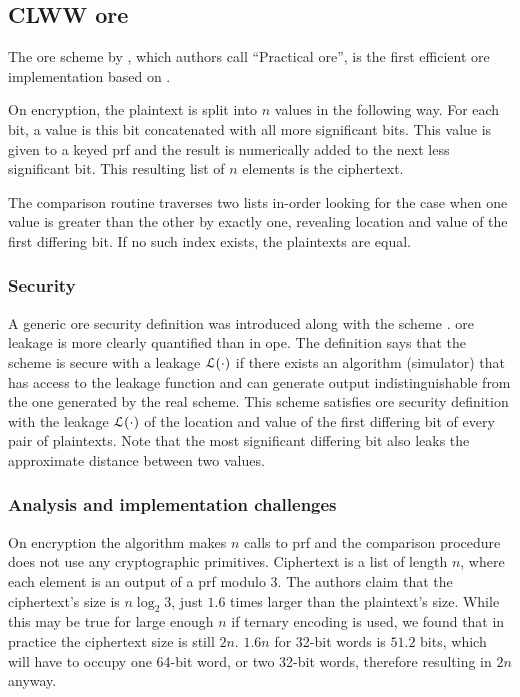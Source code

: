\subsection{CLWW \acrshort{ore}}\label{section:range-snapshot:clww}

	The \acrshort{ore} scheme by \textcite{clww-ore}, which authors call ``Practical \acrshort{ore}'', is the first efficient \acrshort{ore} implementation based on .

	On encryption, the plaintext is split into $n$ values in the following way.
	For each bit, a value is this bit concatenated with all more significant bits.
	This value is given to a keyed \acrshort{prf} and the result is numerically added to the next less significant bit.
	This resulting list of $n$ elements is the ciphertext.

	The comparison routine traverses two lists in-order looking for the case when one value is greater than the other by exactly one, revealing location and value of the first differing bit.
	If no such index exists, the plaintexts are equal.

	\subsubsection{Security}
		A generic \acrshort{ore} security definition was introduced along with the scheme \cite{clww-ore}.
		\acrshort{ore} leakage is more clearly quantified than in \acrshort{ope}.
		The definition says that the scheme is secure with a leakage $\mathcal{L}(\cdot)$ if there exists an algorithm (simulator) that has access to the leakage function and can generate output indistinguishable from the one generated by the real scheme.
		This scheme satisfies \acrshort{ore} security definition with the leakage $\mathcal{L}(\cdot)$ of the location and value of the first differing bit of every pair of plaintexts.
		Note that the most significant differing bit also leaks the approximate distance between two values.

	\subsubsection{Analysis and implementation challenges}

		On encryption the algorithm makes $n$ calls to \acrshort{prf} and the comparison procedure does not use any cryptographic primitives.
		Ciphertext is a list of length $n$, where each element is an output of a \acrshort{prf} modulo 3.
		The authors claim that the ciphertext's size is $n \log_2 3$, just $1.6$ times larger than the plaintext's size.
		While this may be true for large enough $n$ if ternary encoding is used, we found that in practice the ciphertext size is still $2n$.
		$1.6 n$ for 32-bit words is $51.2$ bits, which will have to occupy one 64-bit word, or two 32-bit words, therefore resulting in $2n$ anyway.
